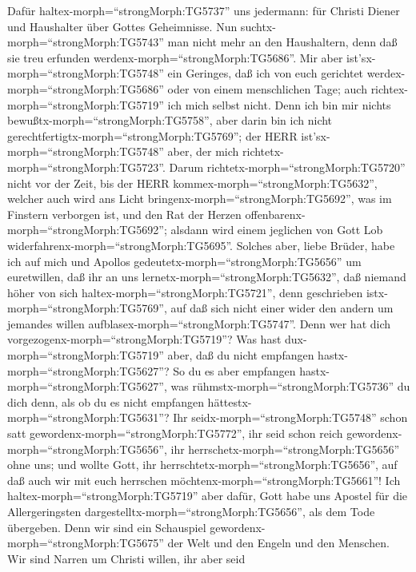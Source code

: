  Dafür haltex-morph=``strongMorph:TG5737'' uns jedermann:
für Christi Diener und Haushalter über Gottes Geheimnisse. 
Nun suchtx-morph=``strongMorph:TG5743'' man nicht mehr an den
Haushaltern, denn daß sie treu erfunden
werdenx-morph=``strongMorph:TG5686''.  Mir aber
ist'sx-morph=``strongMorph:TG5748'' ein Geringes, daß ich von euch
gerichtet werdex-morph=``strongMorph:TG5686'' oder von einem
menschlichen Tage; auch richtex-morph=``strongMorph:TG5719'' ich mich
selbst nicht.  Denn ich bin mir nichts
bewußtx-morph=``strongMorph:TG5758'', aber darin bin ich nicht
gerechtfertigtx-morph=``strongMorph:TG5769''; der HERR
ist'sx-morph=``strongMorph:TG5748'' aber, der mich
richtetx-morph=``strongMorph:TG5723''.  Darum
richtetx-morph=``strongMorph:TG5720'' nicht vor der Zeit, bis der HERR
kommex-morph=``strongMorph:TG5632'', welcher auch wird ans Licht
bringenx-morph=``strongMorph:TG5692'', was im Finstern verborgen ist,
und den Rat der Herzen offenbarenx-morph=``strongMorph:TG5692''; alsdann
wird einem jeglichen von Gott Lob
widerfahrenx-morph=``strongMorph:TG5695''.  Solches aber,
liebe Brüder, habe ich auf mich und Apollos
gedeutetx-morph=``strongMorph:TG5656'' um euretwillen, daß ihr an uns
lernetx-morph=``strongMorph:TG5632'', daß niemand höher von sich
haltex-morph=``strongMorph:TG5721'', denn geschrieben
istx-morph=``strongMorph:TG5769'', auf daß sich nicht einer wider den
andern um jemandes willen aufblasex-morph=``strongMorph:TG5747''.
 Denn wer hat dich vorgezogenx-morph=``strongMorph:TG5719''?
Was hast dux-morph=``strongMorph:TG5719'' aber, daß du nicht empfangen
hastx-morph=``strongMorph:TG5627''? So du es aber empfangen
hastx-morph=``strongMorph:TG5627'', was
rühmstx-morph=``strongMorph:TG5736'' du dich denn, als ob du es nicht
empfangen hättestx-morph=``strongMorph:TG5631''?  Ihr
seidx-morph=``strongMorph:TG5748'' schon satt
gewordenx-morph=``strongMorph:TG5772'', ihr seid schon reich
gewordenx-morph=``strongMorph:TG5656'', ihr
herrschetx-morph=``strongMorph:TG5656'' ohne uns; und wollte Gott, ihr
herrschtetx-morph=``strongMorph:TG5656'', auf daß auch wir mit euch
herrschen möchtenx-morph=``strongMorph:TG5661''!  Ich
haltex-morph=``strongMorph:TG5719'' aber dafür, Gott habe uns Apostel
für die Allergeringsten dargestelltx-morph=``strongMorph:TG5656'', als
dem Tode übergeben. Denn wir sind ein Schauspiel
gewordenx-morph=``strongMorph:TG5675'' der Welt und den Engeln und den
Menschen.  Wir sind Narren um Christi willen, ihr aber seid
